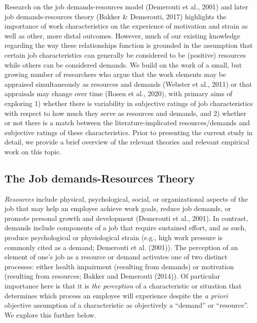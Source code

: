 \documentclass[
  jou,mask]{apa6}
\begin{document}
Research on the job demands-resources model (Demerouti et al., 2001) and later job demands-resources theory (Bakker \& Demerouti, 2017) highlights the importance of work characteristics on the experience of motivation and strain as well as other, more distal outcomes. However, much of our existing knowledge regarding the way these relationships function is grounded in the assumption that certain job characteristics can generally be considered to be (positive) resources while others can be considered demands. We build on the work of a small, but growing number of researchers who argue that the work elements may be appraised simultaneously as resources and demands (Webster et al., 2011) or that appraisals may change over time (Rosen et al., 2020), with primary aims of exploring 1) whether there is variability in subjective ratings of job characteristics with respect to how much they serve as resources and demands, and 2) whether or not there is a match between the literature-implicated resources/demands and subjective ratings of these characteristics. Prior to presenting the current study in detail, we provide a brief overview of the relevant theories and relevant empirical work on this topic.

\hypertarget{the-job-demands-resources-theory}{%
\subsection{The Job demands-Resources Theory}\label{the-job-demands-resources-theory}}

\emph{Resources} include physical, psychological, social, or organizational aspects of the job that may help an employee achieve work goals, reduce job demands, or promote personal growth and development (Demerouti et al., 2001). In contrast, demands include components of a job that require sustained effort, and as such, produce psychological or physiological strain (e.g., high work pressure is commonly cited as a demand; Demerouti et al. (2001)). The perception of an element of one's job as a resource or demand activates one of two distinct processes: either health impairment (resulting from demands) or motivation (resulting from resources; Bakker and Demerouti (2014)). Of particular importance here is that it is \emph{the perception} of a characteristic or situation that determines which process an employee will experience despite the \emph{a priori} objective assumption of a characteristic as objectively a ``demand'' or ``resource''. We explore this further below.
\end{document}
